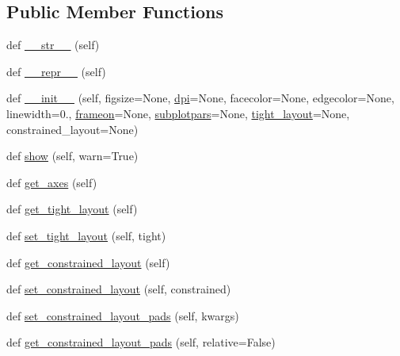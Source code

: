 \subsection*{Public Member Functions}
\begin{DoxyCompactItemize}
\item 
def \hyperlink{classmatplotlib_1_1figure_1_1Figure_a4e65ea9c04cdd143dcf610a62c750fc9}{\+\_\+\+\_\+str\+\_\+\+\_\+} (self)
\item 
def \hyperlink{classmatplotlib_1_1figure_1_1Figure_a040b7cb3917a87093153a7a2efdc1850}{\+\_\+\+\_\+repr\+\_\+\+\_\+} (self)
\item 
def \hyperlink{classmatplotlib_1_1figure_1_1Figure_a381d78fa4db0a667be45e78501710fee}{\+\_\+\+\_\+init\+\_\+\+\_\+} (self, figsize=None, \hyperlink{classmatplotlib_1_1figure_1_1Figure_aec13143c0425f2f9b5e40bd6cfda42dc}{dpi}=None, facecolor=None, edgecolor=None, linewidth=0., \hyperlink{classmatplotlib_1_1figure_1_1FigureBase_a11123dc5aa23e7190a0c4c154430c989}{frameon}=None, \hyperlink{classmatplotlib_1_1figure_1_1Figure_a7554e84ab288d9b470fe78f7f8a0d92b}{subplotpars}=None, \hyperlink{classmatplotlib_1_1figure_1_1Figure_a3c06e4a0479a4f539f312c5fc9b26ead}{tight\+\_\+layout}=None, constrained\+\_\+layout=None)
\item 
def \hyperlink{classmatplotlib_1_1figure_1_1Figure_a80c053e0c4f7d70be80e25d239503ef7}{show} (self, warn=True)
\item 
def \hyperlink{classmatplotlib_1_1figure_1_1Figure_a6367e68d3e0650e547b94b364ea07961}{get\+\_\+axes} (self)
\item 
def \hyperlink{classmatplotlib_1_1figure_1_1Figure_a1b093e80246da4b833fdb0bd589760a3}{get\+\_\+tight\+\_\+layout} (self)
\item 
def \hyperlink{classmatplotlib_1_1figure_1_1Figure_adc3cb28596f3d2e2fa2e73253156a07e}{set\+\_\+tight\+\_\+layout} (self, tight)
\item 
def \hyperlink{classmatplotlib_1_1figure_1_1Figure_a592516bbe8c42d6050053ccd21e4c7d9}{get\+\_\+constrained\+\_\+layout} (self)
\item 
def \hyperlink{classmatplotlib_1_1figure_1_1Figure_a487f4fbe49ecebe718b53c5d5a737b58}{set\+\_\+constrained\+\_\+layout} (self, constrained)
\item 
def \hyperlink{classmatplotlib_1_1figure_1_1Figure_a5949bc30be69d3acb3c66756bc7bdab6}{set\+\_\+constrained\+\_\+layout\+\_\+pads} (self, kwargs)
\item 
def \hyperlink{classmatplotlib_1_1figure_1_1Figure_afac5d61e08d7361ff9d25e79e6b0e7a7}{get\+\_\+constrained\+\_\+layout\+\_\+pads} (self, relative=False)

\end{DoxyCompactItemize}
